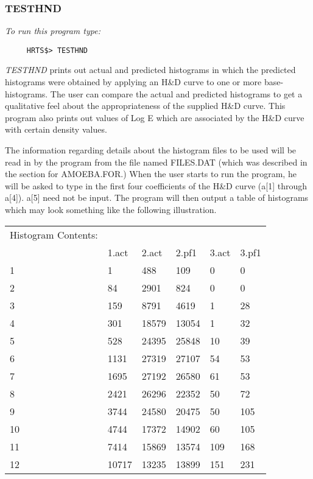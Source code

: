 \subsubsection{TESTHND}

{\em To run this program type:}
\begin{verbatim}
     HRTS$> TESTHND
\end{verbatim}
{\em TESTHND} prints out actual and predicted histograms in which the
   predicted histograms were obtained by applying an H\&D curve to one or
   more base-histograms.  The user can compare the actual and predicted
   histograms to get a qualitative feel about the appropriateness of the
   supplied H\&D curve.  This program also prints out values of Log E which
   are associated by the H\&D curve with certain density values.

       The information regarding details about the histogram files to be
   used will be read in by the program from the file named FILES.DAT
   (which was described in the section for AMOEBA.FOR.)  When the user
   starts to run the program, he will be asked to type in the first four
   coefficients of the H\&D curve (a[1] through a[4]).  a[5] need not be
   input.  The program will then output a table of histograms which may
   look something like the following illustration.
\begin{center}
\begin{tabular}{||l|l|l|l|l|l||}
\hline
        Histogram Contents: &  &  &  &  & \\
             &     1.act  &    2.act  &    2.pf1  &    3.act   &   3.pf1  \\
          1  &         1  &      488  &      109  &        0 &         0 \\
          2  &        84 &      2901 &       824 &         0 &         0 \\
          3  &       159 &       8791 &      4619  &         1 &        28  \\
          4  &       301 &      18579 &      13054 &          1 &        32  \\
          5  &       528 &      24395 &      25848 &         10 &         39 \\
          6  &      1131  &    27319   &   27107    &     54    &     53  \\
          7  &      1695  &    27192   &   26580    &     61    &     53  \\
          8  &      2421  &    26296   &   22352    &     50    &     72  \\
          9  &      3744  &    24580   &   20475    &     50    &    105  \\
         10 &       4744  &    17372   &   14902    &     60    &    105  \\
         11 &       7414  &    15869   &   13574    &    109    &    168  \\
         12 &      10717 &     13235   &   13899    &    151    &    231  \\
\hline
\end{tabular}
\end{center}
